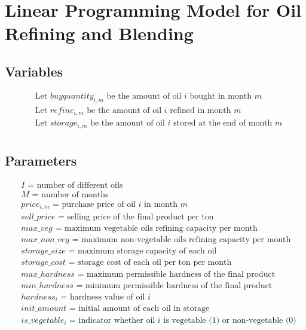 \documentclass{article}
\begin{document}
\section*{Linear Programming Model for Oil Refining and Blending}

\subsection*{Variables}
\begin{align*}
& \text{Let } buyquantity_{i,m} \text{ be the amount of oil } i \text{ bought in month } m \\
& \text{Let } refine_{i,m} \text{ be the amount of oil } i \text{ refined in month } m \\
& \text{Let } storage_{i,m} \text{ be the amount of oil } i \text{ stored at the end of month } m \\
\end{align*}

\subsection*{Parameters}
\begin{align*}
& I \text{ = number of different oils} \\
& M \text{ = number of months} \\
& price_{i,m} \text{ = purchase price of oil } i \text{ in month } m \\
& sell\_price \text{ = selling price of the final product per ton} \\
& max\_veg \text{ = maximum vegetable oils refining capacity per month} \\
& max\_non\_veg \text{ = maximum non-vegetable oils refining capacity per month} \\
& storage\_size \text{ = maximum storage capacity of each oil} \\
& storage\_cost \text{ = storage cost of each oil per ton per month} \\
& max\_hardness \text{ = maximum permissible hardness of the final product} \\
& min\_hardness \text{ = minimum permissible hardness of the final product} \\
& hardness_{i} \text{ = hardness value of oil } i \\
& init\_amount \text{ = initial amount of each oil in storage} \\
& is\_vegetable_{i} \text{ = indicator whether oil } i \text{ is vegetable (1) or non-vegetable (0)} \\
\end{align*}
\end{document}
